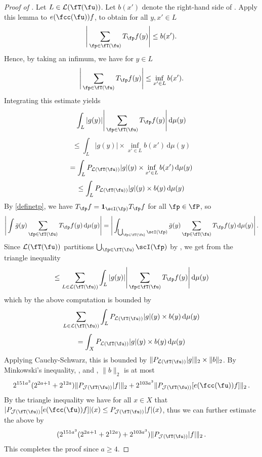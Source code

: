 \begin{proof}[Proof of ]
    \leanok
    Let $L \in \mathcal{L}(\fT(\fu))$.
    Let $b(x')$ denote the right-hand side of . Apply this lemma to $e(\fcc(\fu)) f$, to obtain for all $y, x' \in L$
    $$
        \Bigg| \sum_{\fp \in \fT(\fu)} T_{\fp} f(y) \Bigg| \le b(x').
    $$
    Hence, by taking an infimum, we have for $y \in L$
    $$
        \Bigg| \sum_{\fp \in \fT(\fu)} T_{\fp} f(y) \Bigg| \le \inf_{x' \in L} b(x').
    $$
    Integrating this estimate yields
    $$
        \int_L |g(y)| \Bigg| \sum_{\fp \in \fT(\fu)} T_{\fp} f(y) \Bigg| \, \mathrm{d}\mu(y)
    $$
    $$
        \le \int_L |g(y)| \times \inf_{x' \in L} b(x') \, \mathrm{d}\mu(y)
    $$
    $$
        =   \int_L P_{\mathcal{L}(\fT(\fu))}|g|(y) \times \inf_{x' \in L} b(x') \, \mathrm{d}\mu(y)
    $$
    $$
        \le \int_L P_{\mathcal{L}(\fT(\fu))}|g|(y) \times  b(y) \, \mathrm{d}\mu(y)
    $$
    By \eqref{definetp}, we have $T_{\fp} f = \mathbf{1}_{\scI(\fp)} T_{\fp} f$ for all $\fp \in \fP$, so
    $$
        \Bigg| \int \bar g(y) \sum_{\fp \in \fT(\fu)} T_{\fp} f(y) \, \mathrm{d}\mu(y) \Bigg| = \Bigg| \int_{\bigcup_{\fp \in \fT(\fu)} \scI(\fp)} \bar g(y) \sum_{\fp \in \fT(\fu)} T_{\fp} f(y) \, \mathrm{d}\mu(y) \Bigg|\,.
    $$
    Since $\mathcal{L}(\fT(\fu))$ partitions $\bigcup_{\fp \in \fT(\fu)} \scI(\fp)$ by ,
    we get from the triangle inequality
    $$
        \le \sum_{L \in \mathcal{L}(\fT(\fu))} \int_L |g(y)| \Bigg| \sum_{\fp \in \fT(\fu)} T_{\fp} f(y) \Bigg| \, \mathrm{d}\mu(y)
    $$
    which by the above computation is bounded by
    $$
        \sum_{L \in \mathcal{L}(\fT(\fu))} \int_L P_{\mathcal{L}(\fT(\fu))}|g|(y) \times  b(y) \, \mathrm{d}\mu(y)
    $$
    $$
        = \int_X P_{\mathcal{L}(\fT(\fu))}|g|(y) \times  b(y) \, \mathrm{d}\mu(y)
    $$
    Applying Cauchy-Schwarz, this is bounded by $\|P_{\mathcal{L}(\fT(\fu))}|g|\|_2 \times \|b\|_2$.
    By Minkowski's inequality, ,  and , $\|b\|_2$ is at most
    $$
        2^{151a^3} (2^{2a+1} + 2^{12a})\|P_{\mathcal{J}(\fT(\fu))}|f|\|_2 + 2^{103a^3} \|P_{\mathcal{J}(\fT(\fu))}[e(\fcc(\fu))f]\|_2\,.
    $$
    By the triangle inequality we have for all $x \in X$ that $|P_{\mathcal{J}(\fT(\fu))}[e(\fcc(\fu))f]|(x) \le P_{\mathcal{J}(\fT(\fu))}|f|(x)$, thus we can further estimate the above by
    $$
        (2^{151a^3} (2^{2a+1} + 2^{12a}) + 2^{103a^3}) \|P_{\mathcal{J}(\fT(\fu))}|f|\|_2\,.
    $$
    This completes the proof since $a \ge 4$.
\end{proof}

